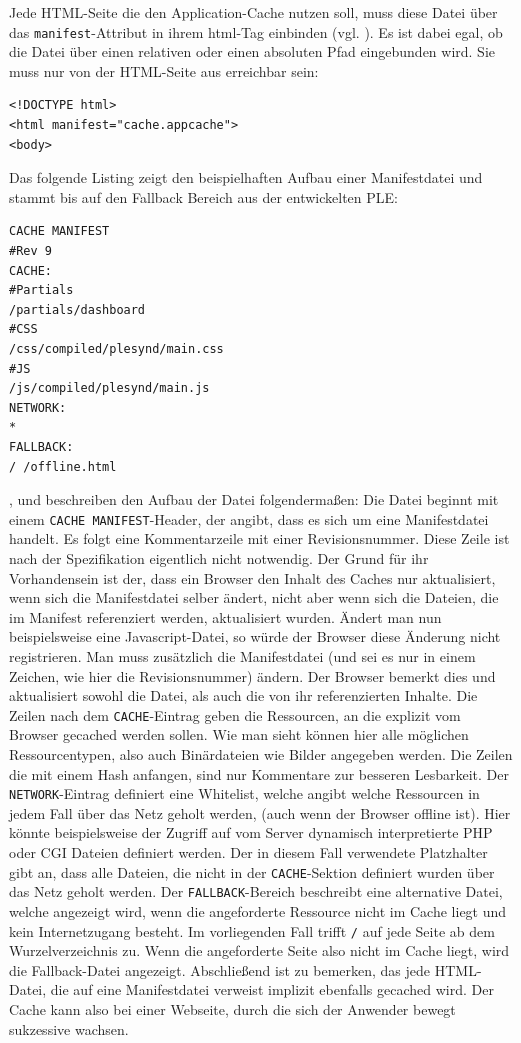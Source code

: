 Jede HTML-Seite die den Application-Cache nutzen soll, muss diese Datei über das \texttt{manifest}-Attribut in ihrem html-Tag einbinden (vgl. \cite{html5upandrunningchapter8}). Es ist dabei egal, ob die Datei über einen relativen oder einen absoluten Pfad eingebunden wird. Sie muss nur von der HTML-Seite aus erreichbar sein:
\begin{lstlisting}
<!DOCTYPE html>
<html manifest="cache.appcache">
<body>
\end{lstlisting}

Das folgende Listing zeigt den beispielhaften Aufbau einer Manifestdatei und stammt bis auf den Fallback Bereich aus der entwickelten PLE:
\begin{lstlisting}
CACHE MANIFEST
#Rev 9
CACHE:
#Partials
/partials/dashboard
#CSS
/css/compiled/plesynd/main.css
#JS
/js/compiled/plesynd/main.js
NETWORK:
*
FALLBACK:
/ /offline.html
\end{lstlisting}

\cite{W3C2012}, \cite{html5upandrunningchapter8} und \cite{Bidelman2010} beschreiben den Aufbau der Datei folgendermaßen: Die Datei beginnt mit einem \texttt{CACHE MANIFEST}-Header, der angibt, dass es sich um eine Manifestdatei handelt. Es folgt eine Kommentarzeile mit einer Revisionsnummer. Diese Zeile ist nach der Spezifikation eigentlich nicht notwendig. Der Grund für ihr Vorhandensein ist der, dass ein Browser den Inhalt des Caches nur aktualisiert, wenn sich die Manifestdatei selber ändert, nicht aber wenn sich die Dateien, die im Manifest referenziert werden, aktualisiert wurden. Ändert man nun beispielsweise eine Javascript-Datei, so würde der Browser diese Änderung nicht registrieren. Man muss zusätzlich die Manifestdatei (und sei es nur in einem Zeichen, wie hier die Revisionsnummer) ändern. Der Browser bemerkt dies und aktualisiert sowohl die Datei, als auch die von ihr referenzierten Inhalte. Die Zeilen nach dem \texttt{CACHE}-Eintrag geben die Ressourcen, an die explizit vom Browser gecached werden sollen. Wie man sieht können hier alle möglichen Ressourcentypen, also auch Binärdateien wie Bilder angegeben werden. Die Zeilen die mit einem Hash anfangen, sind nur Kommentare zur besseren Lesbarkeit. Der \texttt{NETWORK}-Eintrag definiert eine Whitelist, welche angibt welche Ressourcen in jedem Fall über das Netz geholt werden, (auch wenn der Browser offline ist). Hier könnte beispielsweise der Zugriff auf vom Server dynamisch interpretierte PHP oder CGI Dateien definiert werden. Der in diesem Fall verwendete Platzhalter gibt an, dass alle Dateien, die nicht in der \texttt{CACHE}-Sektion definiert wurden über das Netz geholt werden. Der \texttt{FALLBACK}-Bereich beschreibt eine alternative Datei, welche angezeigt wird, wenn die angeforderte Ressource nicht im Cache liegt und kein Internetzugang besteht. Im vorliegenden Fall trifft \texttt{/} auf jede Seite ab dem Wurzelverzeichnis zu. Wenn die angeforderte Seite also nicht im Cache liegt, wird die Fallback-Datei angezeigt. Abschließend ist zu bemerken, das jede HTML-Datei, die auf eine Manifestdatei verweist implizit ebenfalls gecached wird. Der Cache kann also bei einer Webseite, durch die sich der Anwender bewegt sukzessive wachsen.


